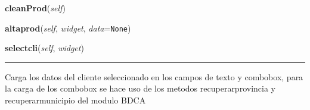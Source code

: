     \vspace{0.5ex}

\hspace{.8\funcindent}\begin{boxedminipage}{\funcwidth}

    \raggedright \textbf{cleanProd}(\textit{self})

\setlength{\parskip}{2ex}
\setlength{\parskip}{1ex}
    \end{boxedminipage}

    \label{main:Main:Restaurante:altaprod}

    \vspace{0.5ex}

\hspace{.8\funcindent}\begin{boxedminipage}{\funcwidth}

    \raggedright \textbf{altaprod}(\textit{self}, \textit{widget}, \textit{data}={\tt None})

\setlength{\parskip}{2ex}
\setlength{\parskip}{1ex}
    \end{boxedminipage}

    \label{main:Main:Restaurante:selectcli}

    \vspace{0.5ex}

\hspace{.8\funcindent}\begin{boxedminipage}{\funcwidth}

    \raggedright \textbf{selectcli}(\textit{self}, \textit{widget})

    \vspace{-1.5ex}

    \rule{\textwidth}{0.5\fboxrule}
\setlength{\parskip}{2ex}
    Carga los datos del cliente seleccionado en los campos de texto y 
    combobox, para la carga de los combobox se hace uso de los metodos 
    recuperarprovincia y recuperarmunicipio del modulo BDCA

\setlength{\parskip}{1ex}
    \end{boxedminipage}

    \label{main:Main:Restaurante:selectprod}


